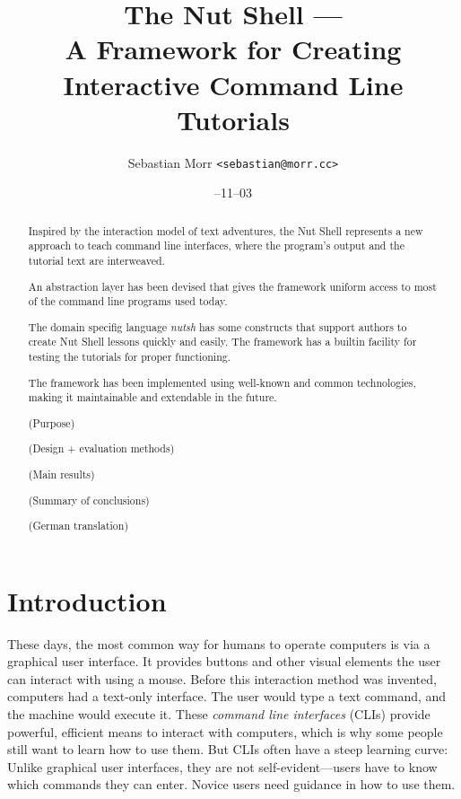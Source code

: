 \documentclass[paper=a4,twoside,abstract=on,cleardoublepage=empty,numbers=noenddot,toc=bib,11pt,appendixprefix=true]{scrreprt}
\title{The Nut Shell ---\\A Framework for Creating\\Interactive Command Line Tutorials}
\author{\sffamily Sebastian Morr \texttt{<sebastian@morr.cc>}}
\date{\sffamily 2013--11--03}
\begin{document}
\maketitle
\restoregeometry


\begin{abstract}
    Inspired by the interaction model of text adventures, the Nut Shell represents a new approach to teach command line interfaces, where the program's output and the tutorial text are interweaved.

    An abstraction layer has been devised that gives the framework uniform access to most of the command line programs used today.

    The domain specifig language \emph{nutsh} has some constructs that support authors to create Nut Shell lessons quickly and easily. The framework has a builtin facility for testing the tutorials for proper functioning.

    The framework has been implemented using well-known and common technologies, making it maintainable and extendable in the future.

    (Purpose)

    (Design + evaluation methods)

    (Main results)

    (Summary of conclusions)
\end{abstract}

%
\begin{abstract}
    (German translation)
\end{abstract}
%

\setcounter{tocdepth}{2}
\tableofcontents
\listoffigures
\listoftables

\chapter{Introduction}

These days, the most common way for humans to operate computers is via a graphical user interface. It provides buttons and other visual elements the user can interact with using a mouse. Before this interaction method was invented, computers had a text-only interface. The user would type a text command, and the machine would execute it. These \emph{command line interfaces} (CLIs) provide powerful, efficient means to interact with computers, which is why some people still want to learn how to use them. But CLIs often have a steep learning curve: Unlike graphical user interfaces, they are not self-evident---users have to know which commands they can enter. Novice users need guidance in how to use them.
\end{document}
